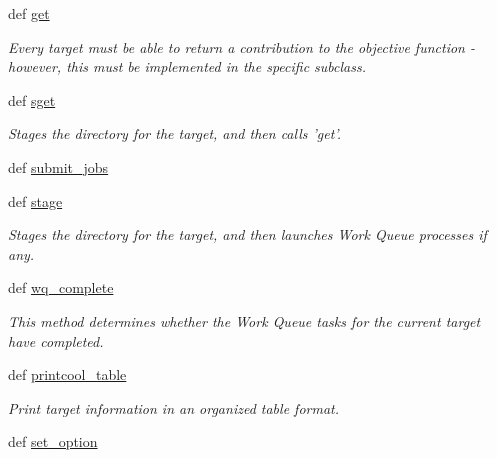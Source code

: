 \begin{DoxyCompactItemize}
def \hyperlink{classforcebalance_1_1target_1_1Target_a1389888302c49d529716cb45b13a6f5a}{get}
\begin{DoxyCompactList}\small\item\em \-Every target must be able to return a contribution to the objective function -\/ however, this must be implemented in the specific subclass. \end{DoxyCompactList}\item 
def \hyperlink{classforcebalance_1_1target_1_1Target_a51d58b55242bf4d4909c1837174f5f3c}{sget}
\begin{DoxyCompactList}\small\item\em \-Stages the directory for the target, and then calls 'get'. \end{DoxyCompactList}\item 
def \hyperlink{classforcebalance_1_1target_1_1Target_a78cd29b94cbcc201eed99c78aaef46a4}{submit\-\_\-jobs}
\item 
def \hyperlink{classforcebalance_1_1target_1_1Target_af8d2a4658c87841e40296795aec478bb}{stage}
\begin{DoxyCompactList}\small\item\em \-Stages the directory for the target, and then launches \-Work \-Queue processes if any. \end{DoxyCompactList}\item 
def \hyperlink{classforcebalance_1_1target_1_1Target_af6099ec09486213869dba2491bd8ea04}{wq\-\_\-complete}
\begin{DoxyCompactList}\small\item\em \-This method determines whether the \-Work \-Queue tasks for the current target have completed. \end{DoxyCompactList}\item 
def \hyperlink{classforcebalance_1_1target_1_1Target_ac30a4e9d7d9fe06f7caefa5f7cfab09b}{printcool\-\_\-table}
\begin{DoxyCompactList}\small\item\em \-Print target information in an organized table format. \end{DoxyCompactList}\item 
def \hyperlink{classforcebalance_1_1BaseClass_a73e9a37a7632e79eb99f49bd15aced45}{set\-\_\-option}
\end{DoxyCompactItemize}
